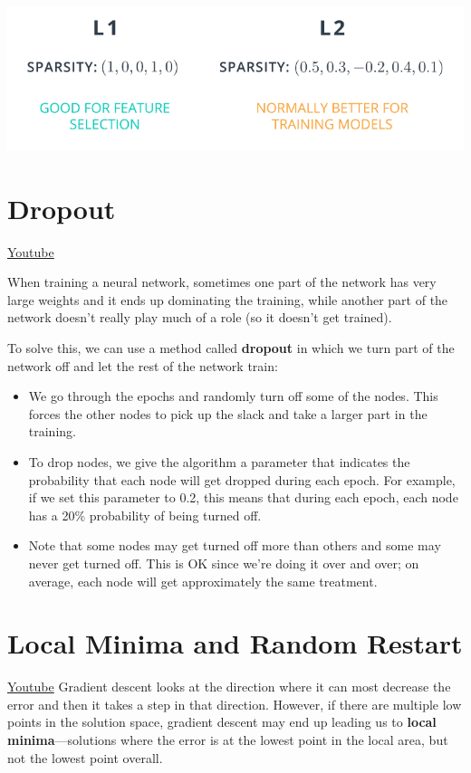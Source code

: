 \includegraphics[width=0.75\linewidth]{img//intro//trainingNN/training-considerations-10.png}



\section{Dropout}
\href{https://www.youtube.com/watch?v=Ty6K6YiGdBs&ab_channel=Udacity}{Youtube} \newline

When training a neural network, sometimes one part of the network has very large weights and it ends up dominating the training, while another part of the network doesn't really play much of a role (so it doesn't get trained).

To solve this, we can use a method called \textbf{dropout} in which we turn part of the network off and let the rest of the network train:

\begin{itemize}
    \item We go through the epochs and randomly turn off some of the nodes. This forces the other nodes to pick up the slack and take a larger part in the training.
    \item To drop nodes, we give the algorithm a parameter that indicates the probability that each node will get dropped during each epoch. For example, if we set this parameter to 0.2, this means that during each epoch, each node has a 20\% probability of being turned off.
    \item Note that some nodes may get turned off more than others and some may never get turned off. This is OK since we're doing it over and over; on average, each node will get approximately the same treatment.
\end{itemize}

\section{Local Minima and Random Restart}
\href{https://www.youtube.com/watch?v=gF_sW_nY-xw&t=1s&ab_channel=Udacity}{Youtube} \newline
Gradient descent looks at the direction where it can most decrease the error and then it takes a step in that direction. However, if there are multiple low points in the solution space, gradient descent may end up leading us to \textbf{local minima}—solutions where the error is at the lowest point in the local area, but not the lowest point overall.

